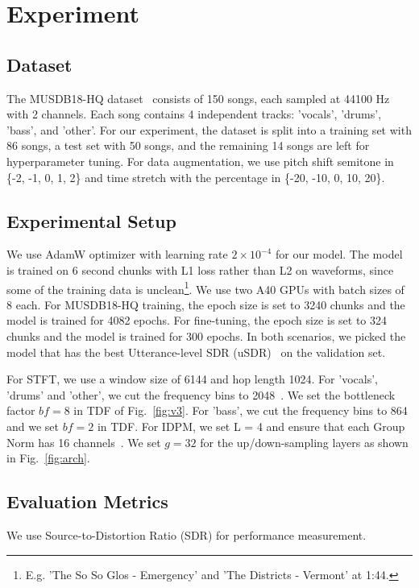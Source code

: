 

\section{Experiment}
\subsection{Dataset}

The MUSDB18-HQ dataset~\cite{MUSDB18} consists of 150 songs, each sampled at 44100 Hz with 2 channels. Each song contains 4 independent tracks: 'vocals', 'drums', 'bass', and 'other'. For our experiment, the dataset is split into a training set with 86 songs, a test set with 50 songs, and the remaining 14 songs are left for hyperparameter tuning. For data augmentation, we use pitch shift semitone in \{-2, -1, 0, 1, 2\} and time stretch with the percentage in \{-20, -10, 0, 10, 20\}.

\subsection{Experimental Setup}
We use AdamW optimizer with learning rate $2 \times 10^{-4}$ for our model. The model is trained on 6 second chunks with L1 loss rather than L2 on waveforms, since some of the training data is unclean\footnote{E.g. 'The So So Glos - Emergency' and 'The Districts - Vermont' at 1:44.}. We use two A40 GPUs with batch sizes of 8 each. For MUSDB18-HQ training, the epoch size is set to 3240 chunks and the model is trained for 4082 epochs. For fine-tuning, the epoch size is set to 324 chunks and the model is trained for 300 epochs. In both scenarios, we picked the model that has the best Utterance-level SDR (uSDR)~\cite{mitsufuji_music_2022} on the validation set. 

For STFT, we use a window size of 6144 and hop length 1024. For 'vocals', 'drums' and 'other', we cut the frequency bins to 2048~\cite{kimKUIELabMDXNetTwoStreamNeural2021}. We set the bottleneck factor $bf=8$ in TDF of Fig.~\ref{fig:v3}. For 'bass', we cut the frequency bins to 864 and we set $bf=2$ in TDF. For IDPM, we set L = 4 and ensure that each Group Norm has 16 channels~\cite{wu_group_2018}. We set $g=32$ for the up/down-sampling layers as shown in Fig.~\ref{fig:arch}.

\subsection{Evaluation Metrics}
We use Source-to-Distortion Ratio (SDR) for performance measurement.

